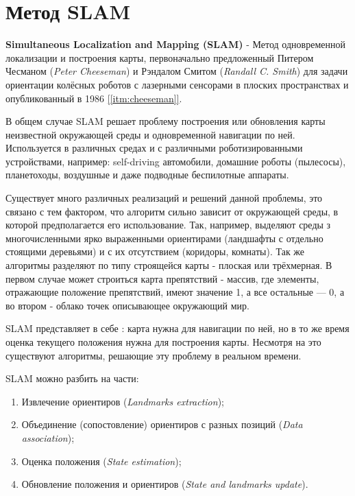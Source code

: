 \section{Метод SLAM}

\textbf{Simultaneous Localization and Mapping (SLAM)} - Метод одновременной локализации и построения карты, первоначально предложенный Питером Чесманом (\textit{Peter Cheeseman}) и Рэндалом Смитом (\textit{Randall C. Smith}) для задачи ориентации колёсных роботов с лазерными сенсорами в плоских пространствах и опубликованный в 1986 \hyperref[itm:cheeseman]{[\ref{itm:cheeseman}]}.

В общем случае SLAM решает проблему построения или обновления карты неизвестной окружающей среды и одновременной навигации по ней. Используется в различных средах и с различными роботизированными устройствами, например: self-driving автомобили, домашние роботы (пылесосы), планетоходы, воздушные и даже подводные беспилотные аппараты.

Существует много различных реализаций и решений данной проблемы, это связано с тем фактором, что алгоритм сильно зависит от окружающей среды, в которой предполагается его использование. Так, например, выделяют среды з многочисленными ярко выраженными ориентирами (ландшафты с отдельно стоящими деревьями) и с их отсутствием (коридоры, комнаты). Так же алгоритмы разделяют по типу строящейся карты - плоская или трёхмерная. В первом случае может строиться карта препятствий - массив, где элементы, отражающие положение препятствий, имеют значение 1, а все остальные — 0, а во втором - облако точек описывающее окружающий мир.

SLAM представляет в себе : карта нужна для навигации по ней, но в то же время оценка текущего положения нужна для построения карты. Несмотря на это существуют алгоритмы, решающие эту проблему в реальном времени.

SLAM можно разбить на части:
\begin{enumerate}
    \item Извлечение ориентиров (\textit{Landmarks extraction});
    \item Объединение (сопостовление) ориентиров с разных позиций (\textit{Data association});
    \item Оценка положения (\textit{State estimation});
    \item Обновление положения и ориентиров (\textit{State and landmarks update}).
\end{enumerate}

